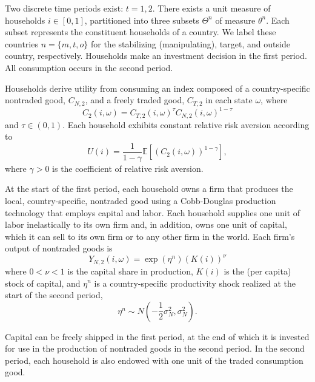 \documentclass[12pt,letter]{article}
\theoremstyle{break} \theorembodyfont{\normalfont\itshape}
\theoremstyle{break}
\theoremstyle{break} \theorembodyfont{\normalfont\itshape}
\theoremstyle{break} \theorembodyfont{\normalfont\itshape}
\begin{document}
Two discrete time periods exist: $t = 1, 2$. There exists a unit
measure of households $i\in [0, 1]$, partitioned into three subsets
$\Theta ^{n}$ of measure $\theta ^{n}$. Each subset represents the
constituent households of a country. We label these countries
$n=\{m, t, o\}$ for the stabilizing (manipulating), target, and
outside country, respectively. Households make an investment decision
in the first period. All consumption occurs in the second period.

Households derive utility from consuming an index composed of a
country-specific nontraded good, $C_{N, 2}$, and a freely traded good,
$C_{T, 2}$ in each state $\omega$, where
\begin{equation}
  C_2(i,\omega) = C_{T, 2}(i,\omega)^\tau C_{N, 2}(i,\omega)^{1-\tau}
  \label{eqn:cesutil}
\end{equation}
and $\tau \in (0, 1)$. Each household exhibits constant relative risk
aversion according to
\begin{equation}
  U(i) = \frac{1}{1- \gamma} \mathbb{E} 
  \left[ \left( C_2(i,\omega) \right)^{1 - \gamma} \right],
  \label{eqn:utility}
\end{equation}
where $\gamma > 0$ is the coefficient of relative risk aversion.

At the start of the first period, each household owns a firm that
produces the local, country-specific, nontraded good using a
Cobb-Douglas production technology that employs capital and labor.
Each household supplies one unit of labor inelastically to its own
firm and, in addition, owns one unit of capital, which it can sell to
its own firm or to any other firm in the world. Each firm's output of
nontraded goods is
\begin{equation}
  Y_{N, 2}(i,\omega) = \exp(\eta^n) \left( K(i)\right)^\nu
  \label{eqn:prodN}
\end{equation}
where $0 < \nu < 1$ is the capital share in production, $K(i)$ is the
(per capita) stock of capital, and $\eta^n$ is a country-specific
productivity shock realized at the start of the second period,
\begin{equation*}
  \eta^n \sim N\left( - \frac{1}{2} \sigma_{N}^2, \sigma_{N}^2  \right).
\end{equation*}

Capital can be freely shipped in the first period, at the end of which
it is invested for use in the production of nontraded goods in the
second period. In the second period, each household is also endowed
with one unit of the traded consumption good.
\end{document}
